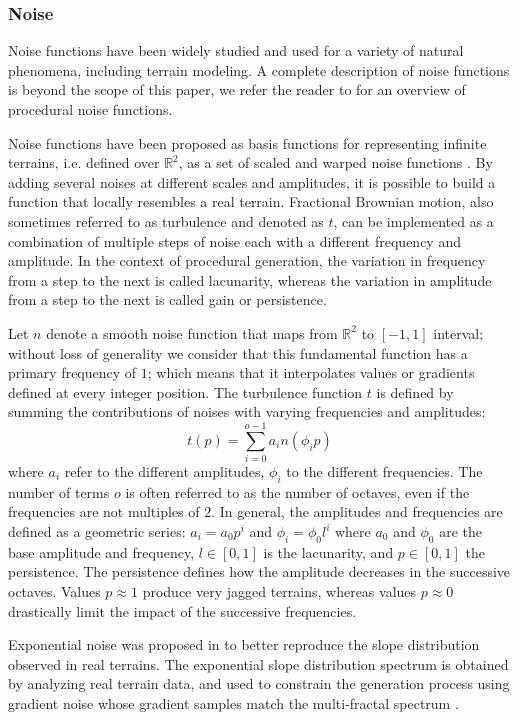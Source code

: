 \documentclass{article}
\begin{document}
\subsubsection{Noise}

Noise functions \cite{Per85, Per89, Wor96, LLDD09} have been widely studied and used for a variety of natural phenomena, including terrain modeling. A complete description of noise functions is beyond the scope of this paper, we refer the reader to \cite{LSC10} for an overview of procedural noise functions.

Noise functions have been proposed as basis functions for representing infinite terrains, i.e. defined over $\mathbb{R}^2$, as a set of scaled and warped noise functions \cite{MKM89, EMP98}. By adding several noises at different scales and amplitudes, it is possible to build a function that locally resembles a real terrain. Fractional Brownian motion, also sometimes referred to as turbulence and denoted as $t$, can be implemented as a combination of multiple steps of noise each with a different frequency and amplitude. In the context of procedural generation, the variation in frequency from a step to the next is called lacunarity, whereas the variation in amplitude from a step to the next is called gain or persistence.

Let $n$ denote a smooth noise function that maps from $\mathbb{R}^2$ to $[-1,1]$ interval; without loss of generality we consider that this fundamental function has a primary frequency of $1$; which means that it interpolates values or gradients defined at every integer position. The turbulence function $t$ is defined by summing the contributions of noises with varying frequencies and amplitudes:
\[
t(p) = \sum_{i=0}^{o-1} a_i n(\phi_i p)
\]
where $a_i$ refer to the different amplitudes, $\phi_i$ to the different frequencies. The number of terms $o$ is often referred to as the number of octaves, even if the frequencies are not multiples of $2$. In general, the amplitudes and frequencies are defined as a geometric series: $a_i = a_0 p^i$ and $\phi_i = \phi_0 l^i$ where $a_0$ and $\phi_0$ are the base amplitude and frequency, $l \in [0,1]$ is the lacunarity, and $p \in [0,1]$ the persistence. The persistence defines how the amplitude decreases in the successive octaves. Values $p \approx 1$ produce very jagged terrains, whereas values $p \approx 0$ drastically limit the impact of the successive frequencies.

Exponential noise was proposed in \cite{Par15} to better reproduce the slope distribution observed in real terrains. The exponential slope distribution spectrum is obtained by analyzing real terrain data, and used to constrain the generation process using gradient noise whose gradient samples match the multi-fractal spectrum \cite{vLJ95, Par14, Par15}.
\end{document}
